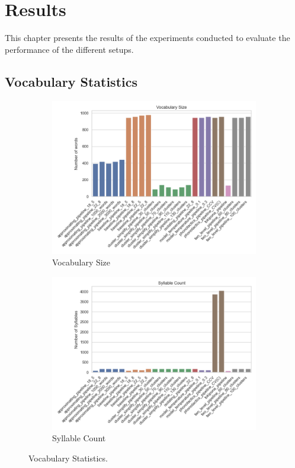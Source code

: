 \chapter{Results}\label{chapter:results}

This chapter presents the results of the experiments conducted to evaluate the performance of the different setups.

\section{Vocabulary Statistics}
\begin{figure}[H]
    \centering
    \begin{subfigure}[b]{0.48\linewidth}
        \includegraphics[width=\linewidth]{figures/results/vocabulary_size.png}
        \caption{Vocabulary Size}
        \label{fig:vocabulary-size}
    \end{subfigure}
    \hfill
    \begin{subfigure}[b]{0.48\textwidth}
        \includegraphics[width=\linewidth]{figures/results/syllable_count.png}
        \caption{Syllable Count}
        \label{fig:syllable-count}
    \end{subfigure}
    \caption{Vocabulary Statistics.}
    \label{fig:vocabulary-statistics}
\end{figure}

